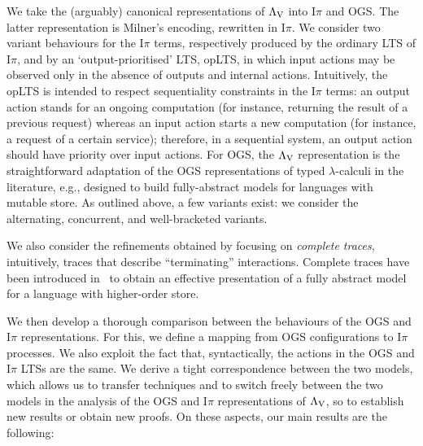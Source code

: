 \documentclass[11pt,a4paper]{amsart}
\theoremstyle{plain}
\theoremstyle{definition}
\theoremstyle{defC}
\theoremstyle{thmC}
\theoremstyle{plain}
\numberwithin{equation}{section}
\def\finish#1{\vskip.2cm\noindent{\em #1}%
  \marginpar{$\longleftarrow$}\vskip.2cm}
\newcommand{\finish}[1]{}
\newcommand{\opLTS}{opLTS\xspace}  %
\newcommand{\LasV}{\Lambda_{\rm V}} %
\newcommand{\Intp}{\mbox{I$\pi$}\xspace}   %
\newcommand{\piI}{\Intp}   %
\newcommand{\ds}[1]{\finish{{\bf DS:} #1}}
\newcommand{\ds}[1]{}
\theoremstyle{plain}
\theoremstyle{definition}
\begin{document}
We take the (arguably) canonical representations of $\LasV$  into \piI 
and OGS.
The latter representation is Milner's encoding,
rewritten in \piI.  We consider two variant  behaviours for the \piI terms, respectively
produced by  the ordinary LTS
of \piI, and by  an `output-prioritised' LTS, \opLTS, 
in which   input actions
may be observed only in the absence of outputs and internal actions. 
Intuitively, the \opLTS is intended to respect sequentiality  constraints in the
\piI terms:  
an  output action stands for an ongoing computation (for instance, returning  the result of
 a previous request) whereas 
an  input
 action starts a 
   new computation
 (for instance, a request of a certain service); therefore,  
in a sequential system, an output action should have priority over input actions.  
 For OGS, the $\LasV$ representation is the straightforward adaptation of the OGS
representations of typed $\lambda$-calculi in the literature, e.g., \cite{laird2007}
designed to build fully-abstract models for languages with mutable store.
As outlined above, a few variants exist:
we consider the  alternating, concurrent,
and well-bracketed variants.

We also consider the refinements obtained by focusing on  \emph{complete traces}, 
intuitively, traces that describe ``terminating'' interactions.
Complete traces have been introduced in~\cite{abramsky1997linearity} to obtain an
effective presentation of a fully abstract model for a language with higher-order store.

We then develop a  thorough comparison between the behaviours of the OGS and \piI
representations. 
For this, we define a mapping from OGS configurations to \piI processes. We also exploit
the fact that, syntactically, the actions in the  OGS and   \piI LTSs are the same.
We derive a tight correspondence between the two models, which allows us to transfer techniques
and  to 
switch  freely between the two models in the analysis of 
the OGS and \piI representations of $\LasV$, 
so to establish new results or obtain new proofs.
On these aspects, our main results  are the following: 
\end{document}
